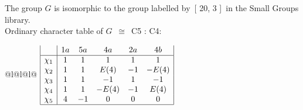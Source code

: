 \documentclass[varwidth=\maxdimen,border=10]{standalone}
\begin{document}
The group $G$ is isomorphic to the group labelled by\ [ 20, 3 ]\ in the Small Groups library.\\
Ordinary character table of $G$\ $\cong$\ C5 : C4:\\
\begin{center}
\begin{tabular}{@{}l@{}l@{}l@{}}
\hline
\(\begin{array}{|l|ccccc|}
  & 1a & 5a & 4a & 2a & 4b\\ \hline
\chi_{1} & 1 & 1 & 1 & 1 & 1\\
\chi_{2} & 1 & 1 & E(4) & -1 & -E(4)\\
\chi_{3} & 1 & 1 & -1 & 1 & -1\\
\chi_{4} & 1 & 1 & -E(4) & -1 & E(4)\\
\chi_{5} & 4 & -1 & 0 & 0 & 0\\
\hline
\end{array}\)\\
\end{tabular}
\end{center}
\end{document}
